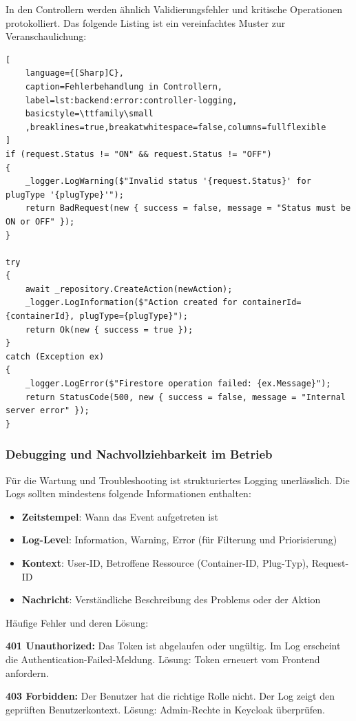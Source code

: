 In den Controllern werden ähnlich Validierungsfehler und kritische Operationen protokolliert. Das folgende Listing ist ein vereinfachtes Muster zur Veranschaulichung:

\begin{lstlisting}[
    language={[Sharp]C},
    caption=Fehlerbehandlung in Controllern,
    label=lst:backend:error:controller-logging,
    basicstyle=\ttfamily\small
    ,breaklines=true,breakatwhitespace=false,columns=fullflexible
]
if (request.Status != "ON" && request.Status != "OFF")
{
    _logger.LogWarning($"Invalid status '{request.Status}' for plugType '{plugType}'");
    return BadRequest(new { success = false, message = "Status must be ON or OFF" });
}

try
{
    await _repository.CreateAction(newAction);
    _logger.LogInformation($"Action created for containerId={containerId}, plugType={plugType}");
    return Ok(new { success = true });
}
catch (Exception ex)
{
    _logger.LogError($"Firestore operation failed: {ex.Message}");
    return StatusCode(500, new { success = false, message = "Internal server error" });
}
\end{lstlisting}

\subsubsection{Debugging und Nachvollziehbarkeit im Betrieb}

Für die Wartung und Troubleshooting ist strukturiertes Logging unerlässlich. Die Logs sollten mindestens folgende Informationen enthalten:

\begin{itemize}
    \item \textbf{Zeitstempel}: Wann das Event aufgetreten ist
    \item \textbf{Log-Level}: Information, Warning, Error (für Filterung und Priorisierung)
    \item \textbf{Kontext}: User-ID, Betroffene Ressource (Container-ID, Plug-Typ), Request-ID
    \item \textbf{Nachricht}: Verständliche Beschreibung des Problems oder der Aktion
\end{itemize}

Häufige Fehler und deren Lösung:

\textbf{401 Unauthorized:} Das Token ist abgelaufen oder ungültig. Im Log erscheint die Authentication-Failed-Meldung. Lösung: Token erneuert vom Frontend anfordern.

\textbf{403 Forbidden:} Der Benutzer hat die richtige Rolle nicht. Der Log zeigt den geprüften Benutzerkontext. Lösung: Admin-Rechte in Keycloak überprüfen.

